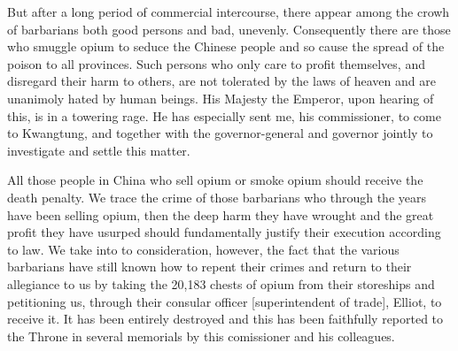 \begin{fancyquote}
	But after a long period of commercial intercourse, there appear among the crowh of barbarians both good persons and bad, unevenly. Consequently there are those who smuggle opium to seduce the Chinese people and so cause the spread of the poison to all provinces. Such persons who only care to profit themselves, and disregard their harm to others, are not tolerated by the laws of heaven and are unanimoly hated by human beings. His Majesty the Emperor, upon hearing of this, is in a towering rage. He has especially sent me, his commissioner, to come to Kwangtung, and together with the governor-general and governor jointly to investigate and settle this matter.\par
	All those people in China who sell opium or smoke opium should receive the death penalty. We trace the crime of those barbarians who through the years have been selling opium, then the deep harm they have wrought and the great profit they have usurped should fundamentally justify their execution according to law. We take into to consideration, however, the fact that the various barbarians have still known how to repent their crimes and return to their allegiance to us by taking the 20,183 chests of opium from their storeships and petitioning us, through their consular officer [superintendent of trade], Elliot, to receive it. It has been entirely destroyed and this has been faithfully reported to the Throne in several memorials by this comissioner and his colleagues.
\end{fancyquote}
